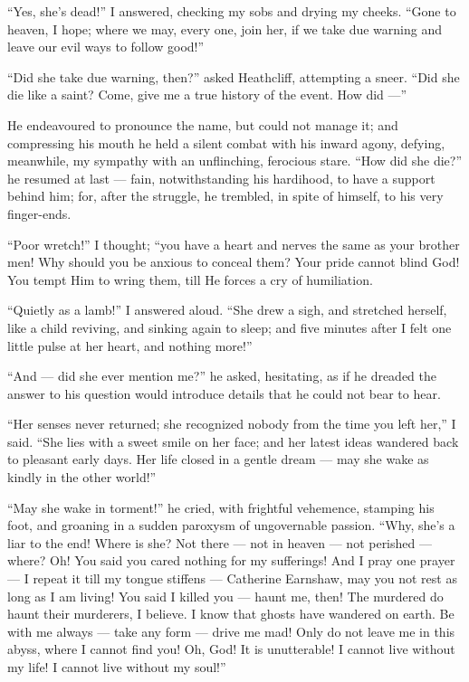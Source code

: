 \par “Yes, she's dead!” I answered, checking my sobs and drying my cheeks. “Gone to heaven, I hope; where we may, every one, join her, if we take due warning and leave our evil ways to follow good!”
\par “Did she take due warning, then?” asked Heathcliff, attempting a sneer. “Did she die like a saint? Come, give me a true history of the event. How did —”
\par He endeavoured to pronounce the name, but could not manage it; and compressing his mouth he held a silent combat with his inward agony, defying, meanwhile, my sympathy with an unflinching, ferocious stare. “How did she die?” he resumed at last — fain, notwithstanding his hardihood, to have a support behind him; for, after the struggle, he trembled, in spite of himself, to his very finger-ends.
\par “Poor wretch!” I thought; “you have a heart and nerves the same as your brother men! Why should you be anxious to conceal them? Your pride cannot blind God! You tempt Him to wring them, till He forces a cry of humiliation.
\par “Quietly as a lamb!” I answered aloud. “She drew a sigh, and stretched herself, like a child reviving, and sinking again to sleep; and five minutes after I felt one little pulse at her heart, and nothing more!”
\par “And — did she ever mention me?” he asked, hesitating, as if he dreaded the answer to his question would introduce details that he could not bear to hear.
\par “Her senses never returned; she recognized nobody from the time you left her,” I said. “She lies with a sweet smile on her face; and her latest ideas wandered back to pleasant early days. Her life closed in a gentle dream — may she wake as kindly in the other world!”
\par “May she wake in torment!” he cried, with frightful vehemence, stamping his foot, and groaning in a sudden paroxysm of ungovernable passion. “Why, she's a liar to the end! Where is she? Not there — not in heaven — not perished — where? Oh! You said you cared nothing for my sufferings! And I pray one prayer — I repeat it till my tongue stiffens — Catherine Earnshaw, may you not rest as long as I am living! You said I killed you — haunt me, then! The murdered do haunt their murderers, I believe. I know that ghosts have wandered on earth. Be with me always — take any form — drive me mad! Only do not leave me in this abyss, where I cannot find you! Oh, God! It is unutterable! I cannot live without my life! I cannot live without my soul!”
